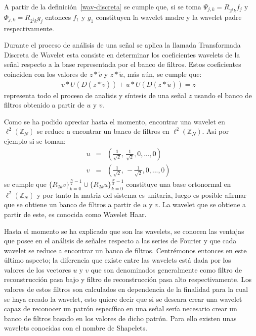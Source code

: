\par A partir de la definici\'on~\ref{wav-discreta} se cumple que, si se toma $\Psi_{j,k}=R_{2^jk}f_j$ y $\Phi_{j,k}=R_{2^jk}g_j$ entonces $f_1$ y $g_1$ constituyen la wavelet madre y la wavelet padre respectivamente.\\

\par Durante el proceso de an\'alisis de una se\~nal se aplica la llamada Transformada Discreta de Wavelet esta consiste en determinar los coeficientes wavelets de la se\~nal respecto a la base representada por el banco de filtros. Estos coeficientes coinciden con los valores de $z\ast\tilde{v}$ y $z\ast\tilde{u}$, m\'as a\'un, se cumple que:
\begin{eqnarray}
v\ast U(D(z\ast\tilde{v}))+u\ast U(D(z\ast\tilde{u}))=z\nonumber
\end{eqnarray}
representa todo el proceso de analisis y s\'intesis de una se\~nal $z$ usando el banco de filtros obtenido a partir de $u$ y $v$.\\

\par Como se ha podido apreciar hasta el momento, encontrar una wavelet en $\ell^2(\mathbb{Z}_N)$ se reduce a encontrar un banco de filtros en $\ell^2(\mathbb{Z}_N)$. Asi por ejemplo si se toman:
\begin{eqnarray}
u&=&\left(\frac{1}{\sqrt{2}},\,\frac{1}{\sqrt{2}},0,...,0\right)\nonumber\\
v&=&\left(\frac{1}{\sqrt{2}},\,-\frac{1}{\sqrt{2}},0,...,0\right)\nonumber
\end{eqnarray}
se cumple que $\{R_{2k}v\}_{k=0}^{\frac{N}{2}-1}\cup\{R_{2k}u\}_{k=0}^{\frac{N}{2}-1}$ constituye una base ortonormal en $\ell^2(\mathbb{Z}_N)$ y por tanto la matriz del sistema es unitaria, luego es posible afirmar que se obtiene un banco de filtros a partir de $u$ y $v$. La wavelet que se obtiene a partir de este, es conocida como Wavelet Haar.\\

\par Hasta el momento se ha explicado que son las wavelets, se conocen las ventajas que posee en el an\'alisis de se\~nales respecto a las series de Fourier y que cada wavelet se reduce a encontrar un banco de filtros. Centr\'emonos entonces en este \'ultimo aspecto; la diferencia que existe entre las wavelets est\'a dada por los valores de los vectores $u$ y $v$ que son denominados generalmente como filtro de reconstrucci\'on pasa bajo y filtro de reconstrucci\'on pasa alto respectivamente. Los valores de estos filtros son calculados en dependencia de la finalidad para la cual se haya creado la wavelet, esto quiere decir que si se deseara crear una wavelet capaz de reconocer un patr\'on espec\'ifico en una se\~nal ser\'ia necesario crear un banco de filtros basado en los valores de dicho patr\'on. Para ello existen unas wavelets conocidas con el nombre de Shapelets.\\

